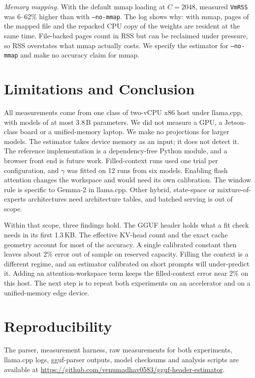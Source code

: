 \documentclass[conference]{IEEEtran}
\begin{document}
\textit{Memory mapping.} With the default mmap loading at $C = 2048$, measured \texttt{VmRSS} was 6--62\% higher than with \texttt{--no-mmap}. The log shows why: with mmap, pages of the mapped file and the repacked CPU copy of the weights are resident at the same time. File-backed pages count in RSS but can be reclaimed under pressure, so RSS overstates what mmap actually costs. We specify the estimator for \texttt{--no-mmap} and make no accuracy claim for mmap.

\section{Limitations and Conclusion}
\label{sec:limits}
All measurements come from one class of two-vCPU x86 host under llama.cpp, with models of at most 3.8\,B parameters. We did not measure a GPU, a Jetson-class board or a unified-memory laptop. We make no projections for larger models. The estimator takes device memory as an input; it does not detect it. The reference implementation is a dependency-free Python module, and a browser front end is future work. Filled-context runs used one trial per configuration, and $\gamma$ was fitted on 12 runs from six models. Enabling flash attention changes the workspace and would need its own calibration. The window rule is specific to Gemma-2 in llama.cpp. Other hybrid, state-space or mixture-of-experts architectures need architecture tables, and batched serving is out of scope.

Within that scope, three findings hold. The GGUF header holds what a fit check needs in its first 1.3\,KB. The effective KV-head count and the exact cache geometry account for most of the accuracy. A single calibrated constant then leaves about 2\% error out of sample on reserved capacity. Filling the context is a different regime, and an estimator calibrated on short prompts will under-predict it. Adding an attention-workspace term keeps the filled-context error near 2\% on this host. The next step is to repeat both experiments on an accelerator and on a unified-memory edge device.

\section*{Reproducibility}
The parser, measurement harness, raw measurements for both experiments, llama.cpp logs, gguf-parser outputs, model checksums and analysis scripts are available at \url{https://github.com/venumadhav0583/gguf-header-estimator}.
\end{document}
